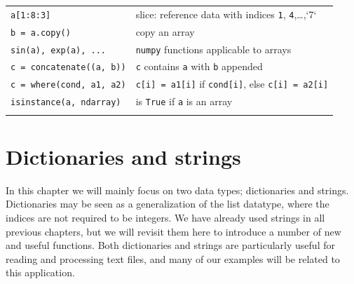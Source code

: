 \documentclass[graybox,envcountchap,sectrefs,final]{svmonodo}
\begin{document}
{\begin{tabular}{ll}
\texttt{a[1:8:3]}                & slice: reference data with indices \texttt{1}, \texttt{4},\ldots,`7`    \\
\texttt{b = a.copy()}            & copy an array                                                       \\
\texttt{sin(a), exp(a), ...}     & \texttt{numpy} functions applicable to arrays                         \\
\texttt{c = concatenate((a, b))} & \texttt{c} contains \texttt{a} with \texttt{b} appended                   \\
\texttt{c = where(cond, a1, a2)} & \texttt{c[i] = a1[i]} if \texttt{cond[i]}, else \texttt{c[i] = a2[i]}     \\
\texttt{isinstance(a, ndarray)}  & is \texttt{True} if \texttt{a} is an array                              \\
\noalign{\smallskip}\hline\noalign{\smallskip}
\end{tabular}

\vspace{4mm}

}


\noindent

\chapter{Dictionaries and strings}
\label{ch:dictstring}

In this chapter we will mainly focus on two data types; dictionaries and strings. Dictionaries may
be seen as a generalization of the list datatype, where the indices are not required to be integers.
We have already used strings in all previous chapters, but we will revisit them here to introduce a
number of new and useful functions. Both dictionaries and strings are particularly useful for
reading and processing text files, and many of our examples will be related to this application.
\end{document}
